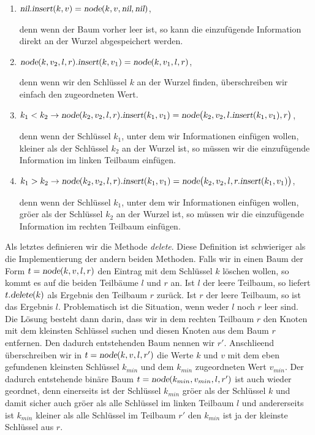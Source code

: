 \begin{enumerate}
\item $\textsl{nil}\mathtt{.}\textsl{insert}(k,v) = \textsl{node}(k,v, \textsl{nil}, \textsl{nil})$,
  
      denn wenn der Baum vorher leer ist, so kann die einzuf\"ugende Information direkt an
      der Wurzel abgespeichert werden.
\item $\textsl{node}(k, v_2, l, r)\mathtt{.}\textsl{insert}(k,v_1) = \textsl{node}(k, v_1, l, r)$,

      denn wenn wir den Schl\"ussel $k$ an der Wurzel finden, \"uberschreiben wir einfach den zugeordneten 
      Wert.
\item $k_1 < k_2 \rightarrow 
          \textsl{node}(k_2, v_2, l, r)\mathtt{.}\textsl{insert}(k_1, v_1) =
          \textsl{node}\bigl(k_2, v_2, l\mathtt{.}\textsl{insert}(k_1, v_1), r\bigr)$,

      denn wenn der Schl\"ussel $k_1$, unter dem wir Informationen einf\"ugen wollen, kleiner
      als der Schl\"ussel $k_2$ an der Wurzel ist, so m\"ussen wir die einzuf\"ugende
      Information im linken Teilbaum einf\"ugen.
\item $k_1 > k_2 \rightarrow 
         \textsl{node}(k_2, v_2, l, r)\mathtt{.}\textsl{insert}(k_1, v_1) = 
         \textsl{node}\bigl(k_2, v_2, l, r\mathtt{.}\textsl{insert}(k_1, v_1)\bigr)$,

      denn wenn der Schl\"ussel $k_1$, unter dem wir Informationen einf\"ugen wollen, gr\"o\3er
      als der Schl\"ussel $k_2$ an der Wurzel ist, so m\"ussen wir die einzuf\"ugende
      Information im rechten Teilbaum einf\"ugen.
\end{enumerate}
Als letztes definieren wir die Methode \textsl{delete}. Diese Definition ist schwieriger als
die Implementierung der andern beiden Methoden.  Falls wir in einen Baum der Form
$t =\textsl{node}(k,v,l,r)$ den Eintrag mit dem Schl\"ussel $k$ l\"oschen wollen, so
kommt es auf die beiden Teilb\"aume $l$ und $r$ an.  Ist $l$ der leere Teilbaum,
so liefert $t\mathtt{.}\textsl{delete}(k)$ als Ergebnis den Teilbaum $r$ zur\"uck.
Ist $r$ der leere Teilbaum, so ist das Ergebnis $l$.  Problematisch ist die Situation,
wenn weder $l$ noch $r$ leer sind.  
Die L\"osung besteht dann darin, dass wir in dem rechten
Teilbaum $r$ den Knoten mit dem kleinsten Schl\"ussel suchen und diesen Knoten aus dem
Baum $r$ entfernen.  Den dadurch entstehenden Baum nennen wir $r'$.
 Anschlie\3end \"uberschreiben wir in $t =\textsl{node}(k,v,l,r')$ die
Werte $k$ und $v$ mit dem eben gefundenen kleinsten Schl\"ussel $k_{min}$ und dem $k_{min}$
zugeordneten Wert $v_{min}$.  Der dadurch entstehende bin\"are Baum 
$t=\textsl{node}(k_{min},v_{min},l,r')$
 ist auch wieder
geordnet, denn einerseits ist der Schl\"ussel $k_{min}$  gr\"o\3er als der Schl\"ussel $k$ und
damit sicher auch gr\"o\3er als alle Schl\"ussel im linken Teilbaum $l$ und andererseits ist
$k_{min}$ kleiner als alle  Schl\"ussel im Teilbaum $r'$ den $k_{min}$ ist ja der
kleinste Schl\"ussel aus $r$.  

